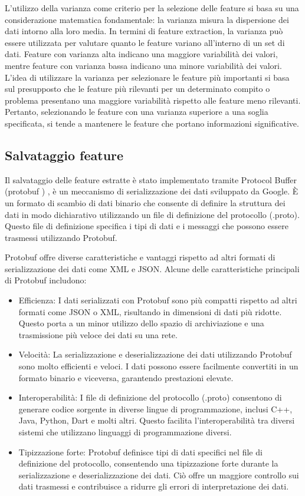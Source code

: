 \documentclass[a4paper,12pt]{report}
\begin{document}
      L'utilizzo della varianza come criterio per la selezione delle feature si basa su una considerazione matematica fondamentale:
      la varianza misura la dispersione dei dati intorno alla loro media.
      In termini di feature extraction, la varianza può essere utilizzata 
      per valutare quanto le feature variano all'interno di un set di dati.
      Feature con varianza alta indicano una maggiore variabilità dei valori,
      mentre feature con varianza bassa indicano una minore variabilità dei valori.
      L'idea di utilizzare la varianza per selezionare le feature 
      più importanti si basa sul presupposto che le feature più rilevanti 
      per un determinato compito o problema presentano una maggiore variabilità rispetto alle feature meno rilevanti.
      Pertanto, selezionando le feature con una varianza superiore a una soglia specificata, 
      si tende a mantenere le feature che portano informazioni significative.
      \subsection{Salvataggio feature}
      Il salvataggio delle feature estratte è stato implementato tramite Protocol Buffer (protobuf
      ) \cite{protobuf},
      è un meccanismo di serializzazione dei dati sviluppato da Google.
      È un formato di scambio di dati binario che consente di definire la struttura 
      dei dati in modo dichiarativo utilizzando un file di definizione del protocollo (.proto).
      Questo file di definizione specifica i tipi di dati e i messaggi che possono essere trasmessi utilizzando Protobuf.

      Protobuf offre diverse caratteristiche e vantaggi rispetto ad altri formati di serializzazione dei dati come XML e JSON.
      Alcune delle caratteristiche principali di Protobuf includono:
      \begin{itemize}
        \item Efficienza: I dati serializzati con Protobuf sono più compatti rispetto ad altri formati come JSON o XML, risultando in dimensioni di dati più ridotte. Questo porta a un minor utilizzo dello spazio di archiviazione e una trasmissione più veloce dei dati su una rete.
        \newpage
        \item Velocità: La serializzazione e deserializzazione dei dati utilizzando Protobuf sono molto efficienti e veloci. I dati possono essere facilmente convertiti in un formato binario e viceversa, garantendo prestazioni elevate.
        \item Interoperabilità: I file di definizione del protocollo (.proto) consentono di generare codice sorgente in diverse lingue di programmazione, inclusi C++, Java, Python, Dart e molti altri. Questo facilita l'interoperabilità tra diversi sistemi che utilizzano linguaggi di programmazione diversi.
        \item Tipizzazione forte: Protobuf definisce tipi di dati specifici nel file di definizione del protocollo, consentendo una tipizzazione forte durante la serializzazione e deserializzazione dei dati. Ciò offre un maggiore controllo sui dati trasmessi e contribuisce a ridurre gli errori di interpretazione dei dati.
      \end{itemize}
      \newpage
\end{document}
